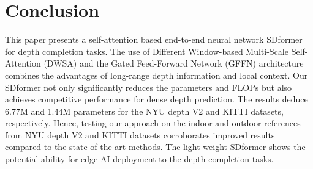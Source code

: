 \documentclass[conference]{IEEEtran}
\begin{document}
\begin{table}[htbp]
\caption{Ablation study for parameters of SDformer.}
\begin{center}
\label{table:study}
\end{center}
\end{table}

\section{Conclusion}
This paper presents a self-attention based end-to-end neural network SDformer for depth completion tasks. The use of Different Window-based Multi-Scale Self-Attention (DWSA) and the Gated Feed-Forward Network (GFFN) architecture combines the advantages of long-range depth information and local context. Our SDformer not only significantly reduces the parameters and FLOPs but also achieves competitive performance for dense depth prediction. The results deduce 6.77M and 1.44M parameters for the NYU depth V2 and KITTI datasets, respectively. Hence, testing our approach on the indoor and outdoor references from NYU depth V2 and KITTI datasets corroborates improved results compared to the state-of-the-art methods. The light-weight SDformer shows the potential ability for edge AI deployment to the depth completion tasks.
\end{document}

